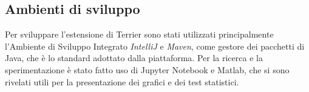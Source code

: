 \subsection{Ambienti di sviluppo}
Per sviluppare l'estensione di Terrier sono stati utilizzati principalmente
l'Ambiente di Sviluppo Integrato \textit{IntelliJ} e \textit{Maven},
come gestore dei pacchetti di Java, che
è lo standard adottato dalla piattaforma.
Per la ricerca e la sperimentazione è stato fatto uso di Jupyter Notebook
e Matlab, che si sono rivelati utili per la presentazione dei grafici
e dei test statistici.
